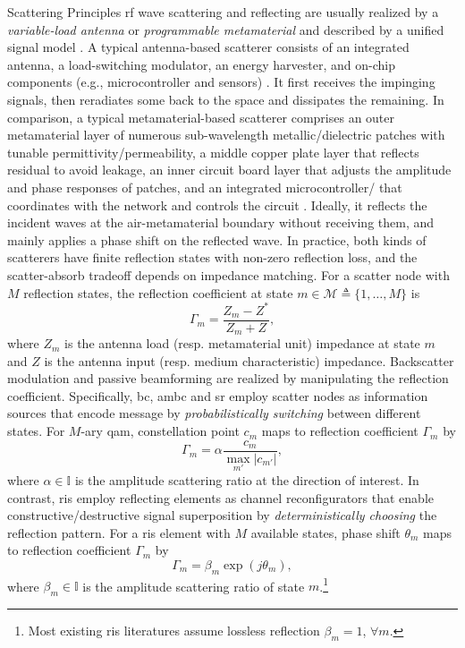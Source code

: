 \documentclass[journal]{IEEEtran}
\begin{document}
\begin{section}{Scattering Principles}
	\gls{rf} wave scattering and reflecting are usually realized by a \emph{variable-load antenna} or \emph{programmable metamaterial} and described by a unified signal model \cite{Liang2022}.
	A typical antenna-based scatterer consists of an integrated antenna, a load-switching modulator, an energy harvester, and on-chip components (e.g., microcontroller and sensors) \cite{Dobkin2012}.
	It first receives the impinging signals, then reradiates some back to the space and dissipates the remaining.
	In comparison, a typical metamaterial-based scatterer comprises an outer metamaterial layer of numerous sub-wavelength metallic/dielectric patches with tunable permittivity/permeability, a middle copper plate layer that reflects residual to avoid leakage, an inner circuit board layer that adjusts the amplitude and phase responses of patches, and an integrated microcontroller/ that coordinates with the network and controls the circuit \cite{Wu2020}.
	Ideally, it reflects the incident waves at the air-metamaterial boundary without receiving them, and mainly applies a phase shift on the reflected wave.
	In practice, both kinds of scatterers have finite reflection states with non-zero reflection loss, and the scatter-absorb tradeoff depends on impedance matching.
	For a scatter node with $M$ reflection states, the reflection coefficient at state $m \in \mathcal{M} \triangleq \{1,\ldots,M\}$ is
	\begin{equation}
		\Gamma_m = \frac{Z_m - Z^*}{Z_m + Z},
		\label{eq:reflection_coefficient}
	\end{equation}
	where $Z_m$ is the antenna load (resp. metamaterial unit) impedance at state $m$ and $Z$ is the antenna input (resp. medium characteristic) impedance.
	Backscatter modulation and passive beamforming are realized by manipulating the reflection coefficient.
	Specifically, \gls{bc}, \gls{ambc} and \gls{sr} employ scatter nodes as information sources that encode message by \emph{probabilistically switching} between different states.
	For $M$-ary \gls{qam}, constellation point $c_m$ maps to reflection coefficient $\Gamma_m$ by \cite{Thomas2012a}
	\begin{equation}
		\Gamma_m = \alpha \frac{c_m}{\max_{m'} \lvert c_{m'} \rvert},
		\label{eq:backscatter_modulation}
	\end{equation}
	where $\alpha \in \mathbb{I}$ is the amplitude scattering ratio at the direction of interest.
	In contrast, \gls{ris} employ reflecting elements as channel reconfigurators that enable constructive/destructive signal superposition by \emph{deterministically choosing} the reflection pattern.
	For a \gls{ris} element with $M$ available states, phase shift $\theta_m$ maps to reflection coefficient $\Gamma_m$ by \cite{Wu2018}
	\begin{equation}
		\Gamma_m = \beta_m \exp(j \theta_m),
		\label{eq:passive_beamforming}
	\end{equation}
	where $\beta_m \in \mathbb{I}$ is the amplitude scattering ratio of state $m$.\footnote{Most existing \gls{ris} literatures assume lossless reflection $\beta_m=1$, $\forall m$.}
\end{section}
\end{document}
